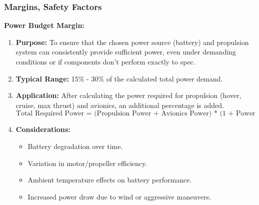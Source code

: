 \documentclass[12pt]{report}
\begin{document}
        \subsubsection{\large Margins, Safety Factors}
        \textbf{\large Power Budget Margin:} \\
        \begin{enumerate}
          \item \textbf{Purpose:} To ensure that the chosen power source (battery) and propulsion system can consistently provide sufficient power, even under demanding conditions or if components don't perform exactly to spec.
          \item \textbf{Typical Range:} 15\% - 30\% of the calculated total power demand.
          \item \textbf{Application:} After calculating the power required for propulsion (hover, cruise, max thrust) and avionics, an additional percentage is added. 
            \[ \text{Total Required Power = (Propulsion Power + Avionics Power) * (1 + Power Margin)} \]
          \item \textbf{Considerations:} 
            \begin{itemize}
              \item Battery degradation over time.
              \item Variation in motor/propeller efficiency.
              \item Ambient temperature effects on battery performance.
              \item Increased power draw due to wind or aggressive maneuvers.
            \end{itemize}
        \end{enumerate}
\end{document}
